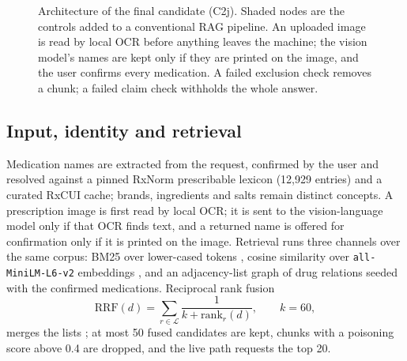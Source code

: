 \documentclass[conference]{IEEEtran}
\begin{document}
\begin{figure}[!t]
{}
\caption{Architecture of the final candidate (C2j). Shaded nodes are the controls added to a conventional RAG pipeline.
An uploaded image is read by local OCR before anything leaves the machine; the vision model's names are kept only if
they are printed on the image, and the user confirms every medication. A failed exclusion check removes a chunk; a
failed claim check withholds the whole answer.}
\label{fig:arch}
\end{figure}

\subsection{Input, identity and retrieval}

Medication names are extracted from the request, confirmed by the user and resolved against a pinned RxNorm
prescribable lexicon \cite{nelson2011rxnorm} (12{,}929 entries) and a curated RxCUI cache; brands, ingredients and salts
remain distinct concepts. A prescription image is first read by local OCR; it is sent to the vision-language model
only if that OCR finds text, and a returned name is offered for confirmation only if it is printed on the image.
Retrieval runs three channels over the same corpus: BM25 over lower-cased tokens
\cite{robertson2009bm25}, cosine similarity over \texttt{all-MiniLM-L6-v2} embeddings \cite{reimers2019sbert}, and an
adjacency-list graph of drug relations seeded with the confirmed medications. Reciprocal rank fusion
\begin{equation}
\mathrm{RRF}(d) = \sum_{r \in \mathcal{L}} \frac{1}{k + \mathrm{rank}_r(d)}, \qquad k = 60,
\label{eq:rrf}
\end{equation}
merges the lists \cite{cormack2009rrf}; at most 50 fused candidates are kept, chunks with a poisoning score above 0.4
are dropped, and the live path requests the top 20.
\end{document}
